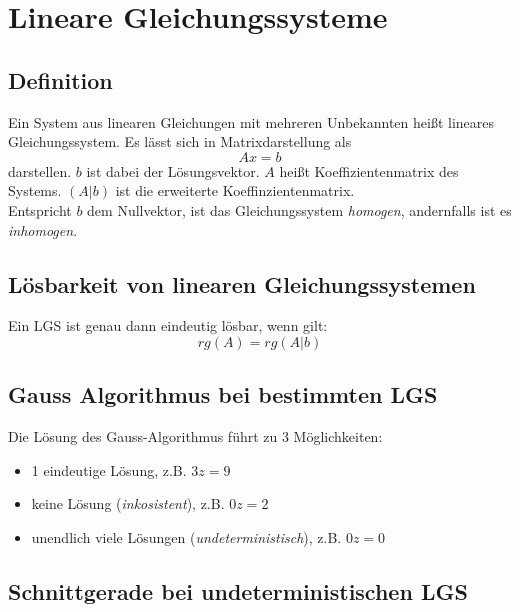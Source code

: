
\section{Lineare Gleichungssysteme}
\label{sec:lineare_gleichungssysteme}

\subsection{Definition}
\label{sub:definition-lgs}

Ein System aus linearen Gleichungen mit mehreren Unbekannten heißt lineares Gleichungssystem. Es lässt
sich in Matrixdarstellung als 
\begin{equation}
	Ax = b
\end{equation}
darstellen. $b$ ist dabei der Lösungsvektor. $A$ heißt Koeffizientenmatrix des Systems. $(A|b)$ ist die erweiterte
Koeffinzientenmatrix. \\
Entspricht $b$ dem Nullvektor, ist das Gleichungssystem \emph{homogen}, andernfalls ist es 
\emph{inhomogen}.

\subsection{L\"{o}sbarkeit von linearen Gleichungssystemen} %
\label{sub:loesbarkeit_von_linearen_gleichungssystemen}

Ein LGS ist genau dann eindeutig lösbar, wenn gilt:
\begin{equation}
	rg(A) = rg(A|b)
\end{equation}

\subsection{Gauss Algorithmus bei bestimmten LGS}
\label{sub:gauss_algorithmus_bei_bestimmten_lgs}

Die Lösung des Gauss-Algorithmus führt zu 3 Möglichkeiten:

\begin{itemize}
	\item 1 eindeutige Lösung, z.B. $3z = 9$
	\item keine Lösung (\emph{inkosistent}), z.B. $0z = 2$
	\item unendlich viele Lösungen (\emph{undeterministisch}), z.B. $0z = 0$
\end{itemize}

\subsection{Schnittgerade bei undeterministischen LGS}
\label{sub:schnittgerade_bei_undeterministischen_lgs}

